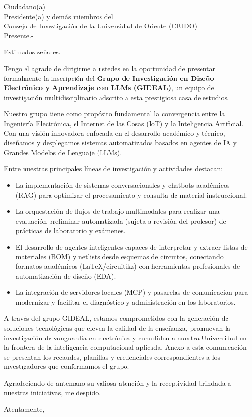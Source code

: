 \documentclass[11pt, a4paper]{letter}
\date{julio 2026}
\begin{document}
\begin{letter}{Ciudadano(a)\\Presidente(a) y demás miembros del\\Consejo de Investigación de la Universidad de Oriente (CIUDO)\\Presente.-}

\opening{Estimados señores:}

Tengo el agrado de dirigirme a ustedes en la oportunidad de presentar formalmente la inscripción del \textbf{Grupo de Investigación en Diseño Electrónico y Aprendizaje con LLMs (GIDEAL)}, un equipo de investigación multidisciplinario adscrito a esta prestigiosa casa de estudios.

Nuestro grupo tiene como propósito fundamental la convergencia entre la Ingeniería Electrónica, el Internet de las Cosas (IoT) y la Inteligencia Artificial. Con una visión innovadora enfocada en el desarrollo académico y técnico, diseñamos y desplegamos sistemas automatizados basados en agentes de IA y Grandes Modelos de Lenguaje (LLMs). 

Entre nuestras principales líneas de investigación y actividades destacan:
\begin{itemize}
    \item La implementación de sistemas conversacionales y chatbots académicos (RAG) para optimizar el procesamiento y consulta de material instruccional.
    \item La orquestación de flujos de trabajo multimodales para realizar una evaluación preliminar automatizada (sujeta a revisión del profesor) de prácticas de laboratorio y exámenes.
    \item El desarrollo de agentes inteligentes capaces de interpretar y extraer listas de materiales (BOM) y netlists desde esquemas de circuitos, conectando formatos académicos (LaTeX/circuitikz) con herramientas profesionales de automatización de diseño (EDA).
    \item La integración de servidores locales (MCP) y pasarelas de comunicación para modernizar y facilitar el diagnóstico y administración en los laboratorios.
\end{itemize}

A través del grupo GIDEAL, estamos comprometidos con la generación de soluciones tecnológicas que eleven la calidad de la enseñanza, promuevan la investigación de vanguardia en electrónica y consoliden a nuestra Universidad en la frontera de la inteligencia computacional aplicada. Anexo a esta comunicación se presentan los recaudos, planillas y credenciales correspondientes a los investigadores que conformamos el grupo.

Agradeciendo de antemano su valiosa atención y la receptividad brindada a nuestras iniciativas, me despido.

\closing{Atentamente,}

\end{letter}
\end{document}
